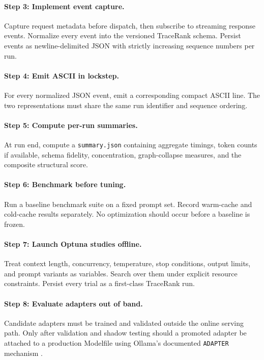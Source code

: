     \paragraph{Step 3: Implement event capture.}
    Capture request metadata before dispatch, then subscribe to streaming response events. Normalize every event into the versioned TraceRank schema. Persist events as newline-delimited JSON with strictly increasing sequence numbers per run.
    
    \paragraph{Step 4: Emit ASCII in lockstep.}
    For every normalized JSON event, emit a corresponding compact ASCII line. The two representations must share the same run identifier and sequence ordering.
    
    \paragraph{Step 5: Compute per-run summaries.}
    At run end, compute a \texttt{summary.json} containing aggregate timings, token counts if available, schema fidelity, concentration, graph-collapse measures, and the composite structural score.
    
    \paragraph{Step 6: Benchmark before tuning.}
    Run a baseline benchmark suite on a fixed prompt set. Record warm-cache and cold-cache results separately. No optimization should occur before a baseline is frozen.
    
    \paragraph{Step 7: Launch Optuna studies offline.}
    Treat context length, concurrency, temperature, stop conditions, output limits, and prompt variants as variables. Search over them under explicit resource constraints. Persist every trial as a first-class TraceRank run.
    
    \paragraph{Step 8: Evaluate adapters out of band.}
    Candidate adapters must be trained and validated outside the online serving path. Only after validation and shadow testing should a promoted adapter be attached to a production Modelfile using Ollama's documented \texttt{ADAPTER} mechanism \cite{ollama_modelfile,ollama_import}.
    
